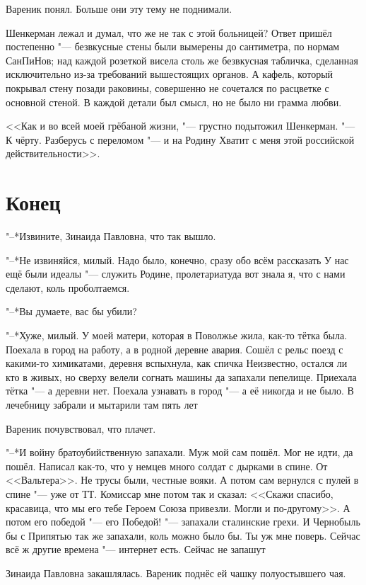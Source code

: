 Вареник понял.
Больше они эту тему не поднимали.

Шенкерман лежал и думал, что же не так с этой больницей?
Ответ пришёл постепенно "--- безвкусные стены были вымерены до сантиметра, по нормам СанПиНов;
над каждой розеткой висела столь же безвкусная табличка, сделанная исключительно из-за требований вышестоящих органов.
А кафель, который покрывал стену позади раковины, совершенно не сочетался по расцветке с основной стеной.
В каждой детали был смысл, но не было ни грамма любви.

<<Как и во всей моей грёбаной жизни, "--- грустно подытожил Шенкерман.
"--- К чёрту.
Разберусь с переломом "--- и на Родину\ldotst
Хватит с меня этой российской действительности>>.

\section{Конец}

"--*Извините, Зинаида Павловна, что так вышло.

"--*Не извиняйся, милый.
Надо было, конечно, сразу обо всём рассказать\ldotst
У нас ещё были идеалы "--- служить Родине, пролетариату\ldotst да вот знала я, что с нами сделают, коль проболтаемся.

"--*Вы думаете, вас бы убили?

"--*Хуже, милый.
У моей матери, которая в Поволжье жила, как-то тётка была.
Поехала в город на работу, а в родной деревне авария.
Сошёл с рельс поезд с какими-то химикатами, деревня вспыхнула, как спичка\ldotst
Неизвестно, остался ли кто в живых, но сверху велели согнать машины да запахали пепелище. 
Приехала тётка "--- а деревни нет.
Поехала узнавать в город "--- а её никогда и не было.
В лечебницу забрали и мытарили там пять лет\ldotst

Вареник почувствовал, что плачет.

"--*И войну братоубийственную запахали.
Муж мой сам пошёл.
Мог не идти, да пошёл.
Написал как-то, что у немцев много солдат с дырками в спине.
От <<Вальтера>>.
Не трусы были, честные вояки.
А потом сам вернулся с пулей в спине "--- уже от ТТ.
Комиссар мне потом так и сказал: <<Скажи спасибо, красавица, что мы его тебе Героем Союза привезли.
Могли и по-другому>>.
А потом его победой "--- его Победой! "--- запахали сталинские грехи. 
И Чернобыль бы с Припятью так же запахали, коль можно было бы.
Ты уж мне поверь. 
Сейчас всё ж другие времена "--- интернет есть.
Сейчас не запашут\ldotst

Зинаида Павловна закашлялась.
Вареник поднёс ей чашку полуостывшего чая.

